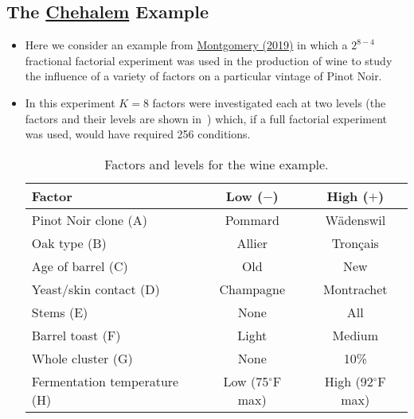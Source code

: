 \subsection{The \href{https://www.chehalemwines.com/}{Chehalem} Example}
\begin{itemize}
    \item Here we consider an example from \href{https://www.wiley.com/en-ca/Design+and+Analysis+of+Experiments C+10th+Edition-p-9781119492443}{Montgomery (2019)} in which a $ 2^{8-4} $ fractional factorial experiment
          was used in the production of wine to study the influence of a variety of factors on a particular vintage
          of Pinot Noir.
    \item In this experiment $K = 8$ factors were investigated each at two levels (the factors and their levels
          are shown in~) which, if a full factorial experiment was used, would have required 256
          conditions.
          \begin{table}[!htbp]
              \centering
              \caption{Factors and levels for the wine example.}\label{tab:wine1}
              \begin{tabular}{lcc}
                  \toprule
                  Factor                       & Low ($ - $)           & High ($ + $)           \\
                  \midrule
                  Pinot Noir clone (A)         & Pommard               & Wädenswil              \\
                  Oak type (B)                 & Allier                & Tronçais               \\
                  Age of barrel (C)            & Old                   & New                    \\
                  Yeast/skin contact (D)       & Champagne             & Montrachet             \\
                  Stems (E)                    & None                  & All                    \\
                  Barrel toast (F)             & Light                 & Medium                 \\
                  Whole cluster (G)            & None                  & 10\%                   \\
                  Fermentation temperature (H) & Low (75$^\circ$F max) & High (92$^\circ$F max) \\
                  \bottomrule
              \end{tabular}

\end{table}
\end{itemize}
